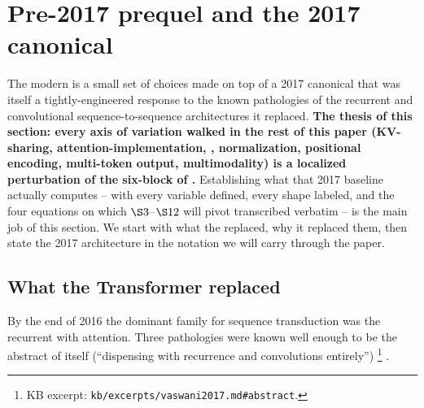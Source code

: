 
\section{Pre-2017 prequel and the 2017 canonical}
\label{sec:prequel-and-canonical}
\label{sec:transformer-overview}

The modern  is a small set of choices made on top of a
2017 canonical that was itself a tightly-engineered response to the
known pathologies of the recurrent and convolutional sequence-to-sequence
architectures it replaced. \textbf{The thesis of this section: every
axis of variation walked in the rest of this paper (KV-sharing,
attention-implementation, , normalization, positional encoding,
multi-token output, multimodality) is a localized perturbation of the
six-block  of \citet{vaswani2017}.} Establishing what
that 2017 baseline actually computes -- with every variable defined,
every shape labeled, and the four equations on which $\S 3$--$\S 12$
will pivot transcribed verbatim -- is the main job of this
section. We start with what the  replaced, why it
replaced them, then state the 2017 architecture in the notation we
will carry through the paper.

\subsection{What the Transformer replaced}
\label{sec:prequel}

By the end of 2016 the dominant family for sequence transduction was
the recurrent  with attention. Three pathologies were
known well enough to be the abstract of \citet{vaswani2017} itself
(``dispensing with recurrence and convolutions
entirely'')%
\footnote{KB excerpt: \nolinkurl{kb/excerpts/vaswani2017.md#abstract}.}
\citep[abstract]{vaswani2017}.

